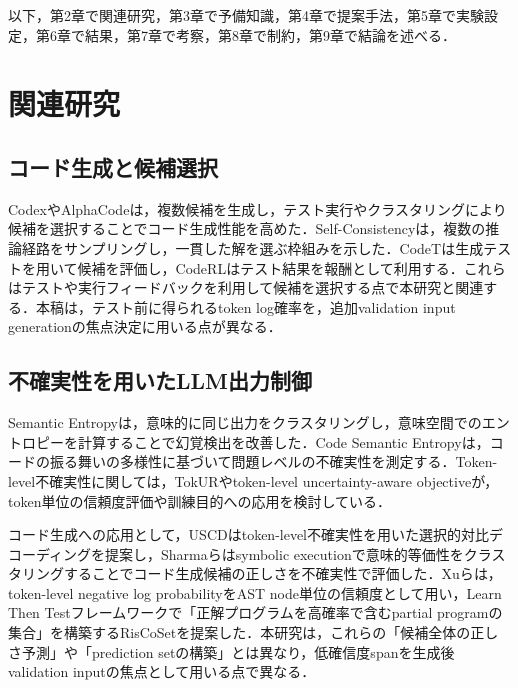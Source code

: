 \documentclass[submit,techrep,noauthor]{ipsj}
\begin{document}
以下，第2章で関連研究，第3章で予備知識，第4章で提案手法，第5章で実験設定，第6章で結果，第7章で考察，第8章で制約，第9章で結論を述べる．

\section{関連研究}

\subsection{コード生成と候補選択}

Codex\cite{chen2021codex}やAlphaCode\cite{li2022alphacode}は，複数候補を生成し，テスト実行やクラスタリングにより候補を選択することでコード生成性能を高めた．Self-Consistency\cite{wang2023selfconsistency}は，複数の推論経路をサンプリングし，一貫した解を選ぶ枠組みを示した．CodeT\cite{chen2022codet}は生成テストを用いて候補を評価し，CodeRL\cite{le2022coderl}はテスト結果を報酬として利用する．これらはテストや実行フィードバックを利用して候補を選択する点で本研究と関連する．本稿は，テスト前に得られるtoken log確率を，追加validation input generationの焦点決定に用いる点が異なる．

\subsection{不確実性を用いたLLM出力制御}

Semantic Entropy\cite{semantic_entropy2024}は，意味的に同じ出力をクラスタリングし，意味空間でのエントロピーを計算することで幻覚検出を改善した．Code Semantic Entropy\cite{code_semantic_entropy2026}は，コードの振る舞いの多様性に基づいて問題レベルの不確実性を測定する．Token-level不確実性に関しては，TokUR\cite{tokur2025}やtoken-level uncertainty-aware objective\cite{token_uq_training2025}が，token単位の信頼度評価や訓練目的への応用を検討している．

コード生成への応用として，USCD\cite{uscd2024}はtoken-level不確実性を用いた選択的対比デコーディングを提案し，Sharmaら\cite{assess_correctness2025}はsymbolic executionで意味的等価性をクラスタリングすることでコード生成候補の正しさを不確実性で評価した．Xuら\cite{riscoset2026}は，token-level negative log probabilityをAST node単位の信頼度として用い，Learn Then Testフレームワークで「正解プログラムを高確率で含むpartial programの集合」を構築するRisCoSetを提案した．本研究は，これらの「候補全体の正しさ予測」や「prediction setの構築」とは異なり，低確信度spanを生成後validation inputの焦点として用いる点で異なる．
\end{document}

